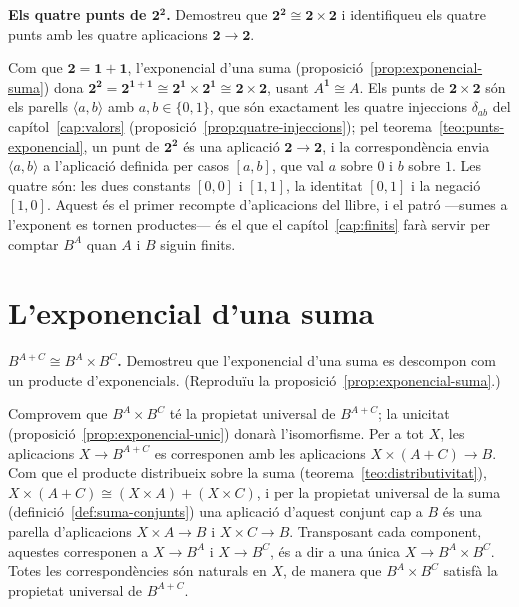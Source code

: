 \begin{exercici}
\textbf{Els quatre punts de \(\mathbf2^{\mathbf2}\).} Demostreu que \(\mathbf2^{\mathbf2}\cong\mathbf2\times\mathbf2\) i identifiqueu els quatre punts amb les quatre aplicacions \(\mathbf2\to\mathbf2\).
\end{exercici}
\begin{solucio}
Com que \(\mathbf2=\mathbf1+\mathbf1\), l'exponencial d'una suma (proposició~\ref{prop:exponencial-suma}) dona \(\mathbf2^{\mathbf2}=\mathbf2^{\mathbf1+\mathbf1}\cong\mathbf2^{\mathbf1}\times\mathbf2^{\mathbf1}\cong\mathbf2\times\mathbf2\), usant \(A^{\mathbf1}\cong A\). Els punts de \(\mathbf2\times\mathbf2\) són els parells \(\langle a,b\rangle\) amb \(a,b\in\{0,1\}\), que són exactament les quatre injeccions \(\delta_{ab}\) del capítol~\ref{cap:valors} (proposició~\ref{prop:quatre-injeccions}); pel teorema~\ref{teo:punts-exponencial}, un punt de \(\mathbf2^{\mathbf2}\) és una aplicació \(\mathbf2\to\mathbf2\), i la correspondència envia \(\langle a,b\rangle\) a l'aplicació definida per casos \([a,b]\), que val \(a\) sobre \(0\) i \(b\) sobre \(1\). Les quatre són: les dues constants \([0,0]\) i \([1,1]\), la identitat \([0,1]\) i la negació \([1,0]\). Aquest és el primer recompte d'aplicacions del llibre, i el patró ---sumes a l'exponent es tornen productes--- és el que el capítol~\ref{cap:finits} farà servir per comptar \(B^A\) quan \(A\) i \(B\) siguin finits.
\end{solucio}

\section{L'exponencial d'una suma}\label{prac:exp-suma}

\begin{exercici}
\textbf{\(B^{A+C}\cong B^{A}\times B^{C}\).} Demostreu que l'exponencial d'una suma es descompon com un producte d'exponencials. (Reproduïu la proposició~\ref{prop:exponencial-suma}.)
\end{exercici}
\begin{solucio}
Comprovem que \(B^{A}\times B^{C}\) té la propietat universal de \(B^{A+C}\); la unicitat (proposició~\ref{prop:exponencial-unic}) donarà l'isomorfisme. Per a tot \(X\), les aplicacions \(X\to B^{A+C}\) es corresponen amb les aplicacions \(X\times(A+C)\to B\). Com que el producte distribueix sobre la suma (teorema~\ref{teo:distributivitat}), \(X\times(A+C)\cong(X\times A)+(X\times C)\), i per la propietat universal de la suma (definició~\ref{def:suma-conjunts}) una aplicació d'aquest conjunt cap a \(B\) és una parella d'aplicacions \(X\times A\to B\) i \(X\times C\to B\). Transposant cada component, aquestes corresponen a \(X\to B^{A}\) i \(X\to B^{C}\), és a dir a una única \(X\to B^{A}\times B^{C}\). Totes les correspondències són naturals en \(X\), de manera que \(B^{A}\times B^{C}\) satisfà la propietat universal de \(B^{A+C}\).
\end{solucio}

